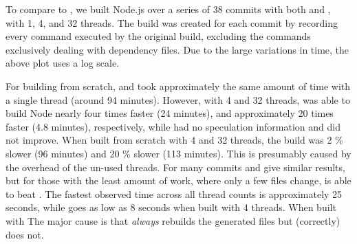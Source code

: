 


\vspace{3mm}

To compare to \Rattle, we built Node.js over a series of 38 commits with both \Make and \Rattle, with 1, 4, and 32 threads. The \Rattle build was created for each commit by recording every command executed by the original build, excluding the commands exclusively dealing with dependency files. Due to the large variations in time, the above plot uses a log scale.

For building from scratch, \Make and \Rattle took approximately the same amount of time with a single thread (around 94 minutes). However, with 4 and 32 threads, \Make was able to build Node nearly four times faster (24 minutes), and approximately 20 times faster (4.8 minutes), respectively, while \Rattle had no speculation information and did not improve. When built from scratch with 4 and 32 threads, the \Rattle build was 2 \% slower (96 minutes) and 20 \% slower (113 minutes). This is presumably caused by the overhead of the un-used threads. For many commits \Rattle and \Make give similar results, but for those with the least amount of work, where only a few files change, \Rattle is able to beat \Make. The fastest observed \Make time across all thread counts is approximately 25 seconds, while \Rattle goes as low as 8 seconds when built with 4 threads.  When built with The major cause is that \Make \emph{always} rebuilds the generated files but \Rattle (correctly) does not.

